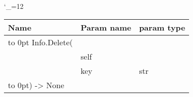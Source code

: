 \begingroup \catcode`\_=12 \tt
\begin{tabular}{lll}
\toprule
\textrm{Name}&\textrm{Param name}&\textrm{param type}\\
\midrule
\hbox to 0pt {Info.Delete(\hss}\\
& self\\
& key & str\\
\hbox to 0pt{) -> None\hss}\\
\bottomrule
\end{tabular}
\endgroup
